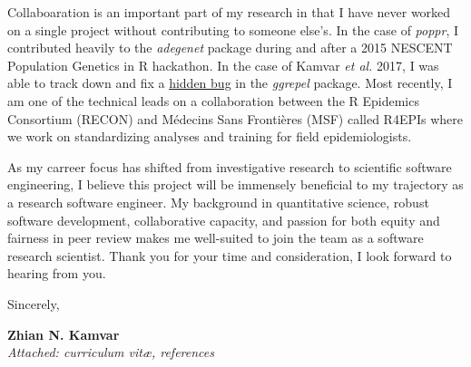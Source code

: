 \vspace{1ex}

Collaboaration is an important part of my research in that I have never worked
on a single project without contributing to someone else's. In the case of
\textit{poppr}, I contributed heavily to the \textit{adegenet} package during
and after a 2015 NESCENT Population Genetics in R hackathon. In the case of
Kamvar \textit{et al.} 2017, I was able to track down and fix a
\href{https://github.com/slowkow/ggrepel/issues/72}{hidden bug} in the
\textit{ggrepel} package. Most recently, I am one of the technical leads on a
collaboration between the R Epidemics Consortium (RECON) and M\'{e}decins Sans
Fronti\`{e}res (MSF) called R4EPIs where we work on standardizing analyses and
training for field epidemiologists.  

\vspace{1ex}

As my carreer focus has shifted from investigative research to scientific
software engineering, I believe this project will be immensely beneficial to my
trajectory as a research software engineer. My background in quantitative
science, robust software development, collaborative capacity, and passion for
both equity and fairness in peer review makes me well-suited to join the team
as a software research scientist. Thank you for your time and consideration, I
look forward to hearing from you. 

\vspace{2ex}

Sincerely,

\vspace{5ex}

\textbf{Zhian N. Kamvar}\\
\textit{Attached: curriculum vit\ae{}, references}
\clearpage




